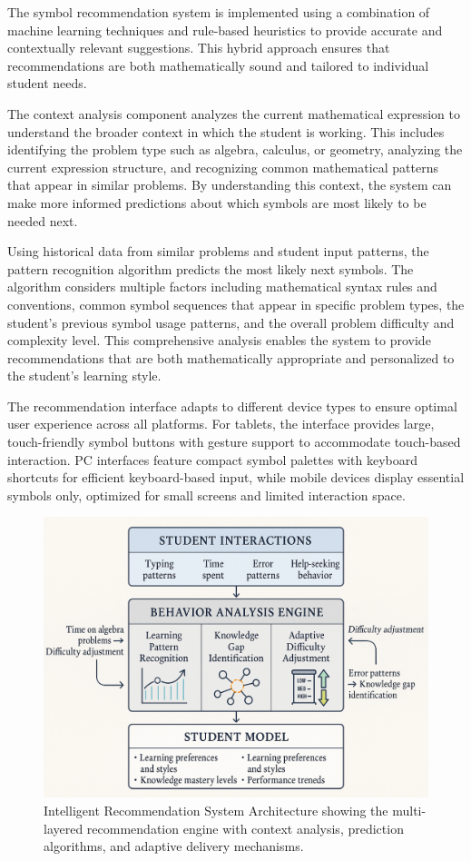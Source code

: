 \documentclass[conference]{IEEEtran}
\begin{document}
The symbol recommendation system is implemented using a combination of machine learning techniques and rule-based heuristics to provide accurate and contextually relevant suggestions. This hybrid approach ensures that recommendations are both mathematically sound and tailored to individual student needs.

The context analysis component analyzes the current mathematical expression to understand the broader context in which the student is working. This includes identifying the problem type such as algebra, calculus, or geometry, analyzing the current expression structure, and recognizing common mathematical patterns that appear in similar problems. By understanding this context, the system can make more informed predictions about which symbols are most likely to be needed next.

Using historical data from similar problems and student input patterns, the pattern recognition algorithm predicts the most likely next symbols. The algorithm considers multiple factors including mathematical syntax rules and conventions, common symbol sequences that appear in specific problem types, the student's previous symbol usage patterns, and the overall problem difficulty and complexity level. This comprehensive analysis enables the system to provide recommendations that are both mathematically appropriate and personalized to the student's learning style.

The recommendation interface adapts to different device types to ensure optimal user experience across all platforms. For tablets, the interface provides large, touch-friendly symbol buttons with gesture support to accommodate touch-based interaction. PC interfaces feature compact symbol palettes with keyboard shortcuts for efficient keyboard-based input, while mobile devices display essential symbols only, optimized for small screens and limited interaction space.

\begin{figure}[htbp]
\centerline{\includegraphics[width=\columnwidth]{3.png}}
\caption{Intelligent Recommendation System Architecture showing the multi-layered recommendation engine with context analysis, prediction algorithms, and adaptive delivery mechanisms.}
\label{fig:recommendation}
\end{figure}
\end{document}
